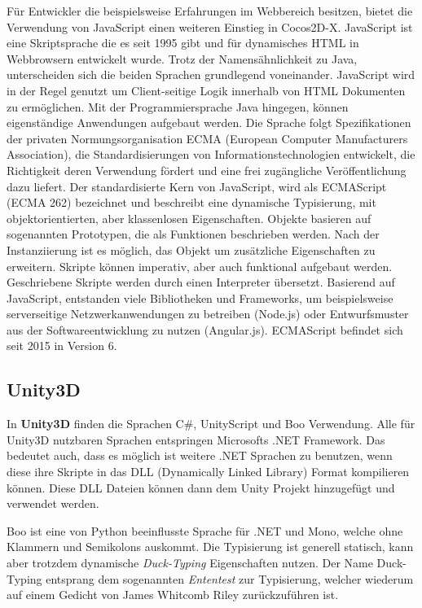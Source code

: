 \medskip
Für Entwickler die beispielsweise Erfahrungen im Webbereich besitzen, bietet die Verwendung von JavaScript einen weiteren Einstieg in Cocos2D-X.
JavaScript ist eine Skriptsprache die es seit 1995 gibt und für dynamisches HTML in Webbrowsern entwickelt wurde. Trotz der Namensähnlichkeit zu Java, unterscheiden sich die beiden Sprachen grundlegend voneinander. JavaScript wird in der Regel genutzt um Client-seitige Logik innerhalb von HTML Dokumenten zu ermöglichen. Mit der Programmiersprache Java hingegen, können eigenständige Anwendungen aufgebaut werden. Die Sprache folgt Spezifikationen der privaten Normungsorganisation ECMA (European Computer Manufacturers Association), die Standardisierungen von Informationstechnologien entwickelt, die Richtigkeit deren Verwendung fördert und eine frei zugängliche Veröffentlichung dazu liefert. Der standardisierte Kern von JavaScript, wird als ECMAScript (ECMA 262) bezeichnet und beschreibt eine dynamische Typisierung, mit objektorientierten, aber klassenlosen Eigenschaften. Objekte basieren auf sogenannten Prototypen, die als Funktionen beschrieben werden. Nach der Instanziierung ist es möglich, das Objekt um zusätzliche Eigenschaften zu erweitern. Skripte können imperativ, aber auch funktional aufgebaut werden. Geschriebene Skripte werden durch einen Interpreter übersetzt. Basierend auf JavaScript, entstanden viele Bibliotheken und Frameworks, um beispielsweise serverseitige Netzwerkanwendungen zu betreiben (Node.js) oder Entwurfsmuster aus der Softwareentwicklung zu nutzen (Angular.js).
ECMAScript befindet sich seit 2015 in Version 6. \citep{learning_javascript}

\subsection{Unity3D}
In \textbf{Unity3D} finden die Sprachen C\#, UnityScript und Boo Verwendung. Alle für Unity3D nutzbaren Sprachen entspringen Microsofts .NET Framework. Das bedeutet auch, dass es möglich ist weitere .NET Sprachen zu benutzen, wenn diese ihre Skripte in das DLL (Dynamically Linked Library) Format kompilieren können. Diese DLL Dateien können dann dem Unity Projekt hinzugefügt und verwendet werden. \citep{unity_managed_plugins}

\medskip
Boo ist eine von Python beeinflusste Sprache für .NET und Mono, welche ohne Klammern und Semikolons auskommt. Die Typisierung ist generell statisch, kann aber trotzdem dynamische \textit{Duck-Typing} Eigenschaften nutzen. \citep{boo_about} Der Name Duck-Typing entsprang dem sogenannten \textit{Ententest} zur Typisierung, welcher wiederum auf einem Gedicht von James Whitcomb Riley zurückzuführen ist.

